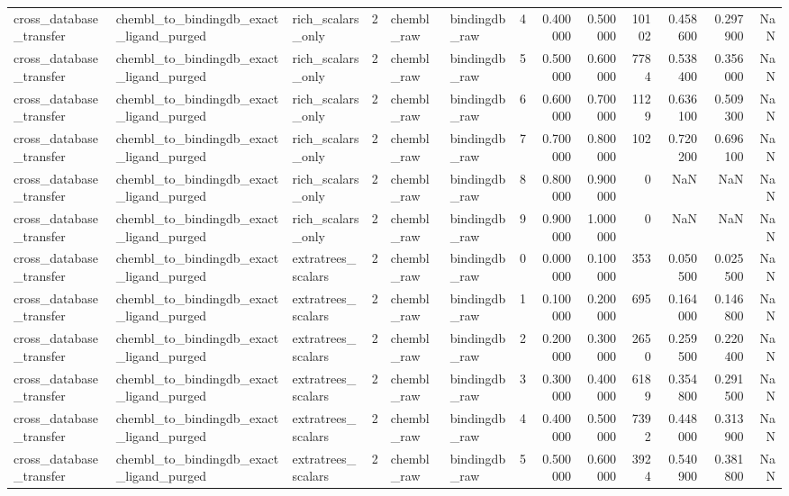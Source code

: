 \begin{longtable}{lllrllrrrrrrr}
cross\_database\_transfer & chembl\_to\_bindingdb\_exact\_ligand\_purged & rich\_scalars\_only & 2 & chembl\_raw & bindingdb\_raw & 4 & 0.400000 & 0.500000 & 10102 & 0.458600 & 0.297900 & NaN \\
cross\_database\_transfer & chembl\_to\_bindingdb\_exact\_ligand\_purged & rich\_scalars\_only & 2 & chembl\_raw & bindingdb\_raw & 5 & 0.500000 & 0.600000 & 7784 & 0.538400 & 0.356000 & NaN \\
cross\_database\_transfer & chembl\_to\_bindingdb\_exact\_ligand\_purged & rich\_scalars\_only & 2 & chembl\_raw & bindingdb\_raw & 6 & 0.600000 & 0.700000 & 1129 & 0.636100 & 0.509300 & NaN \\
cross\_database\_transfer & chembl\_to\_bindingdb\_exact\_ligand\_purged & rich\_scalars\_only & 2 & chembl\_raw & bindingdb\_raw & 7 & 0.700000 & 0.800000 & 102 & 0.720200 & 0.696100 & NaN \\
cross\_database\_transfer & chembl\_to\_bindingdb\_exact\_ligand\_purged & rich\_scalars\_only & 2 & chembl\_raw & bindingdb\_raw & 8 & 0.800000 & 0.900000 & 0 & NaN & NaN & NaN \\
cross\_database\_transfer & chembl\_to\_bindingdb\_exact\_ligand\_purged & rich\_scalars\_only & 2 & chembl\_raw & bindingdb\_raw & 9 & 0.900000 & 1.000000 & 0 & NaN & NaN & NaN \\
cross\_database\_transfer & chembl\_to\_bindingdb\_exact\_ligand\_purged & extratrees\_scalars & 2 & chembl\_raw & bindingdb\_raw & 0 & 0.000000 & 0.100000 & 353 & 0.050500 & 0.025500 & NaN \\
cross\_database\_transfer & chembl\_to\_bindingdb\_exact\_ligand\_purged & extratrees\_scalars & 2 & chembl\_raw & bindingdb\_raw & 1 & 0.100000 & 0.200000 & 695 & 0.164000 & 0.146800 & NaN \\
cross\_database\_transfer & chembl\_to\_bindingdb\_exact\_ligand\_purged & extratrees\_scalars & 2 & chembl\_raw & bindingdb\_raw & 2 & 0.200000 & 0.300000 & 2650 & 0.259500 & 0.220400 & NaN \\
cross\_database\_transfer & chembl\_to\_bindingdb\_exact\_ligand\_purged & extratrees\_scalars & 2 & chembl\_raw & bindingdb\_raw & 3 & 0.300000 & 0.400000 & 6189 & 0.354800 & 0.291500 & NaN \\
cross\_database\_transfer & chembl\_to\_bindingdb\_exact\_ligand\_purged & extratrees\_scalars & 2 & chembl\_raw & bindingdb\_raw & 4 & 0.400000 & 0.500000 & 7392 & 0.448000 & 0.313900 & NaN \\
cross\_database\_transfer & chembl\_to\_bindingdb\_exact\_ligand\_purged & extratrees\_scalars & 2 & chembl\_raw & bindingdb\_raw & 5 & 0.500000 & 0.600000 & 3924 & 0.540900 & 0.381800 & NaN \\

\end{longtable}
